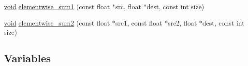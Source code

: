 \begin{DoxyCompactItemize}
\item 
\mbox{\hyperlink{mlasi_8h_a88f941d423cb2a819b70a1358982b1a6}{void}} \mbox{\hyperlink{namespaceonnxruntime_1_1rnn_1_1detail_1_1deepcpu_ab294ebaa35b1aa35d75a9ccf5b363ddb}{elementwise\+\_\+sum1}} (const float $\ast$src, float $\ast$dest, const int size)
\item 
\mbox{\hyperlink{mlasi_8h_a88f941d423cb2a819b70a1358982b1a6}{void}} \mbox{\hyperlink{namespaceonnxruntime_1_1rnn_1_1detail_1_1deepcpu_a4136092f6bcb01967ae4b82f668a9fd6}{elementwise\+\_\+sum2}} (const float $\ast$src1, const float $\ast$src2, float $\ast$dest, const int size)
\end{DoxyCompactItemize}
\subsection*{Variables}
